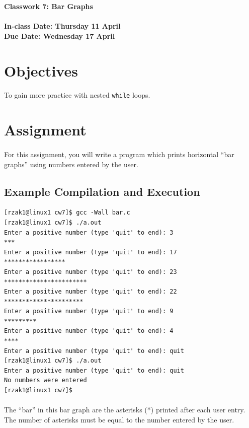 \documentclass[letter,11pt]{article}
\begin{document}
\huge
\textbf{Classwork 7: Bar Graphs}
\normalsize
\\ ~~ \\
\textbf{In-class Date: Thursday 11 April} \\
\textbf{Due Date: Wednesday 17 April}

\section*{Objectives}
\paragraph{}To gain more practice with nested \texttt{while} loops.

\section*{Assignment}
\paragraph{}For this assignment, you will write a program which prints horizontal ``bar graphs'' using numbers entered by the user.

\subsection*{Example Compilation and Execution}
\begin{verbatim}
[rzak1@linux1 cw7]$ gcc -Wall bar.c
[rzak1@linux1 cw7]$ ./a.out
Enter a positive number (type 'quit' to end): 3
***
Enter a positive number (type 'quit' to end): 17
*****************
Enter a positive number (type 'quit' to end): 23
***********************
Enter a positive number (type 'quit' to end): 22
**********************
Enter a positive number (type 'quit' to end): 9
*********
Enter a positive number (type 'quit' to end): 4
****
Enter a positive number (type 'quit' to end): quit
[rzak1@linux1 cw7]$ ./a.out
Enter a positive number (type 'quit' to end): quit
No numbers were entered
[rzak1@linux1 cw7]$
\end{verbatim}

\paragraph{}The ``bar'' in this bar graph are the asterisks (*) printed after each user entry. The number of asterisks must be equal to the number entered by the user.
\end{document}
